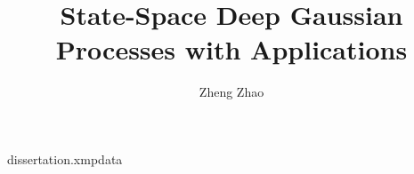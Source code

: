 \RequirePackage{filecontents}
\begin{filecontents*}{dissertation.xmpdata}
\end{filecontents*}

\documentclass[dissertation,final,vertlayout,pdfa,nologo,math]{aaltoseries}

\makeatletter
{}
\makeatother

\hypersetup{bookmarks=true, colorlinks=false, pagebackref=true, hypertexnames=true, hidelinks}

\usepackage[hyperpageref]{backref}
\renewcommand*{\backref}[1]{}
\renewcommand*{\backrefalt}[4]{{
		\ifcase #1 Not cited.%
		\or Cited on page~#2.%
		\else Cited on pages #2.%
		\fi%
	}}

\usepackage[english]{babel}
\usepackage{amsmath,amsthm,amssymb,bm}
\renewcommand*{\arraystretch}{1.2}
\setlength{\jot}{8pt}

\usepackage{emptypage}

\usepackage[SchoolofEngineering]{aaltologo}

\usepackage{CJKutf8}
\usepackage[round, authoryear]{natbib}
\usepackage{graphicx}
\usepackage{mathtools}
\usepackage[shortlabels]{enumitem}

\usepackage{tikz}
\usetikzlibrary{fadings}
\usetikzlibrary{patterns}
\usetikzlibrary{shadows.blur}
\usetikzlibrary{shapes}



\newcommand{\zz}[1]{{\color{red} #1}}

\newcommand*{\hilite}[1]{
\setlength{\fboxsep}{3mm}%
\begin{center}\colorbox{orange}{\parbox{0.9\columnwidth}{\textit{#1}}}\end{center}%
}

\author{Zheng Zhao}
\title{State-Space Deep Gaussian Processes with Applications}



